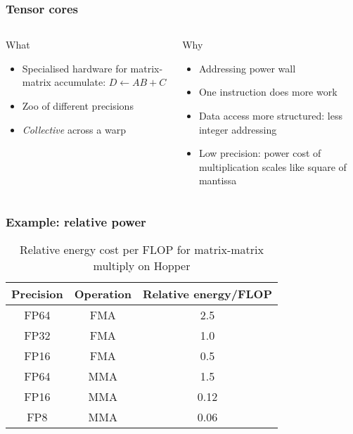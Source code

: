 \documentclass[aspectratio=169]{beamer}
\begin{document}
\begin{frame}
  \frametitle{Tensor cores}
  \begin{columns}[t]
    \begin{column}{0.5\textwidth}
      \begin{block}{What}
        \begin{itemize}
        \item Specialised hardware for matrix-matrix accumulate: $D \gets A B + C$
        \item Zoo of different precisions
        \item \emph{Collective} across a warp
        \end{itemize}
      \end{block}
    \end{column}
    \begin{column}{0.5\textwidth}
      \begin{block}{Why}
        \begin{itemize}
        \item Addressing power wall
        \item One instruction does more work
        \item Data access more structured: less integer addressing
        \item Low precision: power cost of multiplication scales like
          square of mantissa
        \end{itemize}
      \end{block}
    \end{column}
  \end{columns}
\end{frame}

\begin{frame}
  \frametitle{Example: relative power}
  \begin{table}
    \centering
    \begin{tabular}{ccc}
      \toprule
      Precision & Operation & Relative energy/FLOP \\
      \midrule
      FP64 & FMA & 2.5 \\
      FP32 & FMA & 1.0 \\
      FP16 & FMA & 0.5 \\
      FP64 & MMA & 1.5 \\
      FP16 & MMA & 0.12 \\
      FP8 & MMA & 0.06 \\
      \bottomrule
    \end{tabular}
    \caption{Relative energy cost per FLOP for matrix-matrix multiply
      on Hopper}
  \end{table}
\end{frame}
\end{document}
